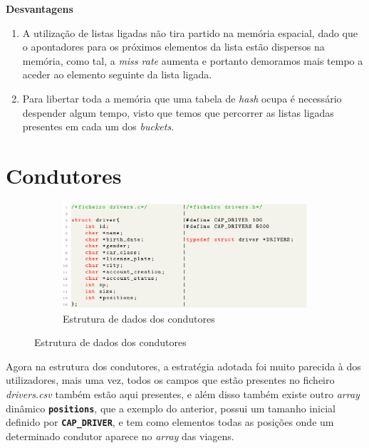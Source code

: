 \documentclass[12pt,a4paper]{report}
\begin{document}
\normalsize\textbf{Desvantagens}
    \begin{enumerate}
        \item A utilização de listas ligadas não tira partido na memória espacial, dado que o apontadores para os próximos elementos da lista estão dispersos na memória, como tal, a \textit{miss rate} aumenta e portanto demoramos mais tempo a aceder ao elemento seguinte da lista ligada.
        
        \item Para libertar toda a memória que uma tabela de \textit{hash} ocupa é necessário despender algum tempo, visto que temos que percorrer as listas ligadas presentes em cada um dos \textit{buckets}.
    \end{enumerate}

\vspace{-0.35cm}
\section{Condutores}

\begin{figure}[hbt!]
    \centering
    \begin{subfigure}{\textwidth}
        \centering
        \includegraphics[width=1\linewidth]{images/drivers.png}
        \caption*{Estrutura de dados dos condutores}
        \label{fig:drivers}
    \end{subfigure}
\end{figure}

Agora na estrutura dos condutores, a estratégia adotada foi muito parecida à dos utilizadores, mais uma vez, todos os campos que estão presentes no ficheiro \textit{drivers.csv} também estão aqui presentes, e além disso também existe outro \textit{array} dinâmico \textbf{\small\texttt{positions}}, que a exemplo do anterior, possui um tamanho inicial definido por \textbf{\small\texttt{CAP\_DRIVER}}, e tem como elementos todas as posições onde um determinado condutor aparece no \textit{array} das viagens.
\end{document}
